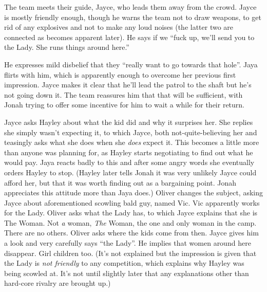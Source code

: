 The team meets their guide, Jayce, who leads them away from the crowd.  Jayce is mostly friendly enough, though he warns the team not to draw weapons, to get rid of any explosives and not to make any loud noises (the latter two are connected as becomes apparent later).  He says if we ``fuck up, we'll send you to the Lady. She runs things around here.''



He expresses mild disbelief that they ``really want to go towards that hole''.  Jaya flirts with him, which is apparently enough to overcome her previous first impression.   Jayce makes it clear that he'll lead the patrol to the shaft but he's not going down it.  The team reassures him that that will be sufficient, with Jonah trying to offer some incentive for him to wait a while for their return.



Jayce asks Hayley about what the kid did and why it surprises her.  She replies she simply wasn't expecting it, to which Jayce, both not-quite-believing her and teasingly asks what she does when she\textit{ does} expect it.  This becomes a little more than anyone was planning for, as Hayley starts negotiating to find out what he would pay.  Jaya reacts badly to this and after some angry words she eventually orders Hayley to stop.  (Hayley later tells Jonah it was very unlikely Jayce could afford her, but that it was worth finding out as a bargaining point.  Jonah appreciates this attitude more than Jaya does.)  Oliver changes the subject, asking Jayce about aforementioned scowling bald guy, named Vic.  Vic apparently works for the Lady.  Oliver asks what the Lady has, to which Jayce explains that she is The Woman.  Not\textit{ a} woman,\textit{ The} Woman, the one and only woman in the camp.  There are no others.  Oliver asks where the kids come from then.  Jayce gives him a look and very carefully says ``the Lady''.  He implies that women around here disappear.  Girl children too.  (It's not explained but the impression is given that the Lady is\textit{ not friendly} to any competition, which explains why Hayley was being scowled at.  It's not until slightly later that any explanations other than hard-core rivalry are brought up.)



